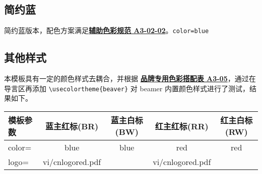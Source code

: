 \documentclass[a4paper,12pt]{article}
\begin{document}
\begin{CJK}{UTF8}{song}
\clearpage
\subsection{简约蓝}

简约蓝版本，配色方案满足\href{http://vi.sjtu.edu.cn/index.php/articles/base/3}{\textbf{辅助色彩规范 A3-02-02}}。\hfill \texttt{color=blue}

\begin{tcbraster}[raster columns=3,colframe=blue,colback=white,
    colbacktitle=blue!50!white,fonttitle=\small\bfseries\ttfamily,
    left=0pt,right=0pt,top=0pt,bottom=0pt,boxsep=0pt,boxrule=0.6pt,
    toptitle=1mm,bottomtitle=1mm,drop lifted shadow,center title,
    graphics pages={1,...,12}]
\end{tcbraster}

\clearpage
\subsection{其他样式}

本模板具有一定的颜色样式去耦合，并根据 \href{http://vi.sjtu.edu.cn/index.php/articles/base/3}{\textbf{品牌专用色彩搭配表 A3-05}}，通过在导言区再添加 \verb"\usecolortheme{beaver}"
对 \textsf{beamer} 内置颜色样式进行了测试，结果如下。

\begin{center}
    \begin{tabular}{|>{\ttfamily}m{5em}|c|c|c|c|}
        \hline
        模板参数 & 蓝主红标(BR) & 蓝主白标(BW) & 红主红标(RR) & 红主白标(RW) \\
        \hline
        color=   & \scriptsize\ttfamily blue & \scriptsize\ttfamily blue & \scriptsize\ttfamily red           & \scriptsize\ttfamily red   \\
        logo=    & \scriptsize\ttfamily vi/cnlogored.pdf & &\scriptsize\ttfamily  vi/cnlogored.pdf& \\
        \hline
    \end{tabular}


\end{center}
\end{CJK}
\end{document}
